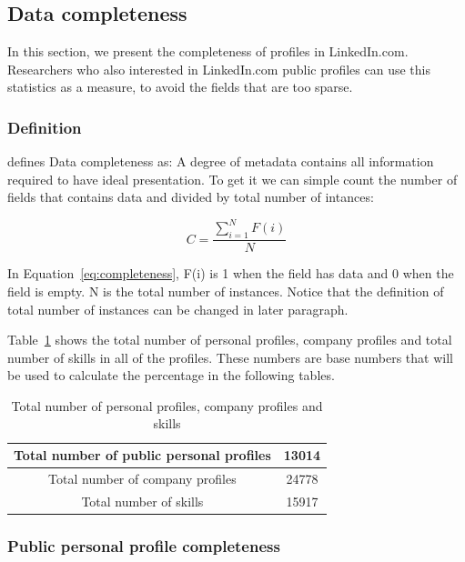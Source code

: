 \subsection{Data completeness}\label{subsec:datacomp}

In this section, we present the completeness of profiles in LinkedIn.com. Researchers who also interested in LinkedIn.com public profiles can use this statistics as a measure, to avoid the fields that are too sparse.

\subsubsection{Definition}

\cite{ochoa2006} defines Data completeness as: A degree of metadata contains all information required to have ideal presentation. To get it we can simple count the number of fields that contains data and divided by total number of intances:

\begin{equation}\label{eq:completeness}
	C=\frac{\sum_{i=1}^{N}F(i)}{N}
\end{equation}

In Equation~\ref{eq:completeness}, F(i) is 1 when the field has data and 0 when the field is empty. N is the total number of instances. Notice that the definition of total number of instances can be changed in later paragraph.

Table~\ref{tab:numCount} shows the total number of personal profiles, company profiles and total number of skills in all of the profiles. These numbers are base numbers that will be used to calculate the percentage in the following tables.

\begin{table}[H]
    \begin{tabular}{|c|c|}
    \hline
    Total number of public personal profiles & 13014 \\ \hline
    Total number of company profiles         & 24778 \\ \hline
    Total number of skills                   & 15917 \\ \hline
    \end{tabular}
    \caption{Total number of personal profiles, company profiles and skills}
  	\label{tab:numCount}
\end{table}

\subsubsection{Public personal profile completeness}\label{subsubsec:personProfileComp}

